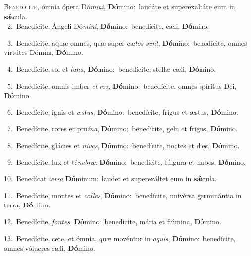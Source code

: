 \lettrine{\initial\textcolor{\initialcolor}{B}}{enedícite,} ómnia ópera Dó\-\textit{mi}\-\textit{ni}, \textbf{Dó}\-mino:~\star laudáte et superexaltáte eum in \textbf{sǽ}\-cula.\\
{\numbfont\textcolor{\numbcolor}{~2.}}~Benedícite, Ángeli Dó\-\textit{mi}\-\textit{ni}, \textbf{Dó}\-mino:~\star benedícite, cæli, \textbf{Dó}\-mino.\par
{\numbfont\textcolor{\numbcolor}{~3.}}~Benedícite, aquæ omnes, quæ super cæ\textit{los} \textit{sunt}\-, \textbf{Dó}\-mino:~\star benedícite, omnes virtútes Dómini, \textbf{Dó}\-mino.\par
{\numbfont\textcolor{\numbcolor}{~4.}}~Benedícite, sol et \textit{lu}\-\textit{na}, \textbf{Dó}\-mino:~\star benedícite, stellæ cæli, \textbf{Dó}\-mino.\par
{\numbfont\textcolor{\numbcolor}{~5.}}~Benedícite, omnis imber \textit{et} \textit{ros}\-, \textbf{Dó}\-mino:~\star benedícite, omnes spíritus Dei, \textbf{Dó}\-mino.\par
{\numbfont\textcolor{\numbcolor}{~6.}}~Benedícite, ignis et \textit{æs}\-\textit{tus}, \textbf{Dó}\-mino:~\star benedícite, frigus et æstus, \textbf{Dó}\-mino.\par
{\numbfont\textcolor{\numbcolor}{~7.}}~Benedícite, rores et pru\-\textit{í}\-\textit{na}, \textbf{Dó}\-mino:~\star benedícite, gelu et frigus, \textbf{Dó}\-mino.\par
{\numbfont\textcolor{\numbcolor}{~8.}}~Benedícite, glácies et \textit{ni}\-\textit{ves}, \textbf{Dó}\-mino:~\star benedícite, noctes et dies, \textbf{Dó}\-mino.\par
{\numbfont\textcolor{\numbcolor}{~9.}}~Benedícite, lux et té\-\textit{ne}\-\textit{bræ}, \textbf{Dó}\-mino:~\star benedícite, fúlgura et nubes, \textbf{Dó}\-mino.\par
{\numbfont\textcolor{\numbcolor}{10.}}~Benedícat \textit{ter}\-\textit{ra} \textbf{Dó}\-minum:~\star laudet et superexáltet eum in \textbf{sǽ}\-cula.\par
{\numbfont\textcolor{\numbcolor}{11.}}~Benedícite, montes et \textit{col}\-\textit{les}, \textbf{Dó}\-mino:~\star benedícite, univérsa germinántia in terra, \textbf{Dó}\-mino.\par
{\numbfont\textcolor{\numbcolor}{12.}}~Benedícite, \textit{fon}\-\textit{tes}, \textbf{Dó}\-mino:~\star benedícite, mária et flúmina, \textbf{Dó}\-mino.\par
{\numbfont\textcolor{\numbcolor}{13.}}~Benedícite, cete, et ómnia, quæ movéntur in \textit{a}\-\textit{quis}, \textbf{Dó}\-mino:~\star benedícite, omnes vólucres cæli, \textbf{Dó}\-mino.\par
